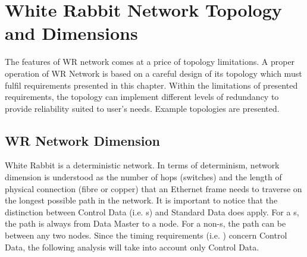 \section{White Rabbit Network Topology and Dimensions}  



The features of WR network comes at a price of topology
limitations. A proper operation of WR Network is based on a careful design of
its topology which must fulfil requirements presented in this chapter. Within
the limitations of presented requirements, the topology can implement different
levels of redundancy to provide reliability suited to user's needs. Example
topologies are presented.

\subsection{WR Network Dimension}

White Rabbit is a deterministic network. In terms of determinism,
network dimension is understood as the number of hops (switches) and the length
of physical connection (fibre or copper) that an Ethernet frame needs to
traverse on the longest possible path in the network. It is important to notice
that the distinction between Control Data (i.e. \ControlMessage s) and Standard
Data does apply. For a \ControlMessage s, the path is always from Data Master to
a node. For a non-\ControlMessage s, the path can be between any two nodes.
Since the timing requirements (i.e. \GW) concern Control Data, the following
analysis will take into account only Control Data.

